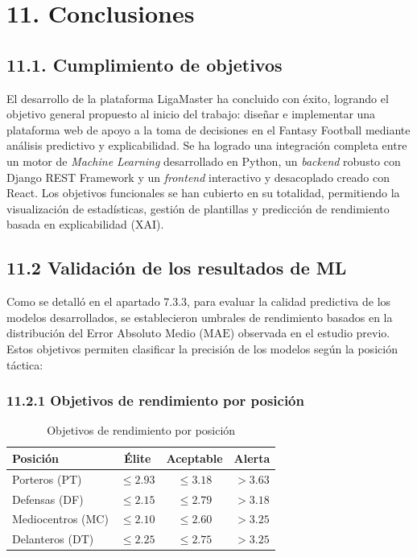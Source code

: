 \section*{11. Conclusiones}
\subsection{11.1. Cumplimiento de objetivos}

El desarrollo de la plataforma LigaMaster ha concluido con éxito,
 logrando el objetivo general propuesto al inicio del trabajo: diseñar
  e implementar una plataforma web de apoyo a la toma de decisiones en
   el Fantasy Football mediante análisis predictivo y explicabilidad. 
   Se ha logrado una integración completa entre un motor de \textit{Machine Learning}
    desarrollado en Python, un \textit{backend} robusto con Django REST Framework y
     un \textit{frontend} interactivo y desacoplado creado con React. Los objetivos 
     funcionales se han cubierto en su totalidad, permitiendo la visualización de estadísticas,
      gestión de plantillas y predicción de rendimiento basada en explicabilidad (XAI).


\subsection{11.2 Validación de los resultados de ML}

Como se detalló en el apartado 7.3.3, para evaluar la calidad 
predictiva de los modelos desarrollados, se establecieron umbrales 
de rendimiento basados en la distribución del Error Absoluto Medio 
($\mathrm{MAE}$) observada en el estudio previo. Estos objetivos 
permiten clasificar la precisión de los modelos según la posición 
táctica:


\subsubsection{11.2.1 Objetivos de rendimiento por posición}

\begin{table}[H]
\centering
\small
\begin{tabular}{|l|c|c|c|}
\hline
\textbf{Posición} & \textbf{Élite} & \textbf{Aceptable} & 
\textbf{Alerta} \\
\hline
Porteros (PT) & $\le 2.93$ & $\le 3.18$ & 
$> 3.63$ \\
Defensas (DF) & $\le 2.15$ & $\le 2.79$ & 
$> 3.18$ \\
Mediocentros (MC) & $\le 2.10$ & $\le 2.60$ & 
$> 3.25$ \\
Delanteros (DT) & $\le 2.25$ & $\le 2.75$ & 
$> 3.25$ \\
\hline
\end{tabular}
\caption{Objetivos de rendimiento por posición}
\end{table}


